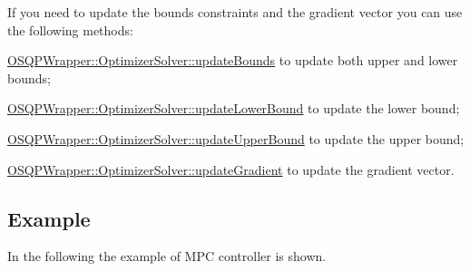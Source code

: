 If you need to update the bounds constraints and the gradient vector you can use the following methods\+:
\begin{DoxyItemize}
\item {\ttfamily \hyperlink{classOSQPWrapper_1_1OptimizerSolver_a3934859f7cbfa10587ae81c6f0bfd436}{O\+S\+Q\+P\+Wrapper\+::\+Optimizer\+Solver\+::update\+Bounds}} to update both upper and lower bounds;
\item {\ttfamily \hyperlink{classOSQPWrapper_1_1OptimizerSolver_a414284af643a95340616a1024cd0f2de}{O\+S\+Q\+P\+Wrapper\+::\+Optimizer\+Solver\+::update\+Lower\+Bound}} to update the lower bound;
\item {\ttfamily \hyperlink{classOSQPWrapper_1_1OptimizerSolver_a41d267f5a7c13a7c9caa9b0be4370fcf}{O\+S\+Q\+P\+Wrapper\+::\+Optimizer\+Solver\+::update\+Upper\+Bound}} to update the upper bound;
\item {\ttfamily \hyperlink{classOSQPWrapper_1_1OptimizerSolver_a075b3b0f98fb9ff5b3924a3b00b58913}{O\+S\+Q\+P\+Wrapper\+::\+Optimizer\+Solver\+::update\+Gradient}} to update the gradient vector.
\end{DoxyItemize}\hypertarget{index_results}{}\subsection{Example}\label{index_results}
In the following the example of M\+PC controller is shown. 
